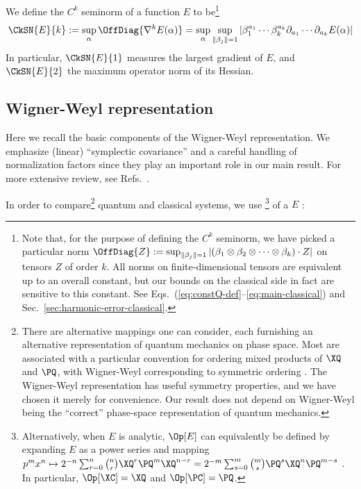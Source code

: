 \documentclass{article}
\numberwithin{equation}{section}
\begin{document}
We define the $C^k$ seminorm of a function $E$ to be\footnote{Note that, for the purpose of defining the $C^k$ seminorm, we have picked a particular norm $\OffDiag{Z} := \sup_{\|\beta_j\|=1}|(\beta_1\otimes\beta_2\otimes\cdots\otimes\beta_k)\cdot Z|$ on tensors $Z$ of order $k$. All norms on finite-dimensional tensors are equivalent up to an overall constant, but our bounds on the classical side in fact are sensitive to this constant. See Eqs.~(\ref{eq:constQ-def}--\ref{eq:main-classical}) and Sec.~\ref{sec:harmonic-error-classical}.}
\begin{align}
    \label{eq:c-k-seminorm-def}
    \CkSN{E}{k} := 
    \sup_\alpha \OffDiag{\nabla^k E(\alpha)}
    = \sup_\alpha \sup_{\|\beta_j\|=1}
    \left|\beta_1^{a_1} \cdots \beta_k^{a_k} \partial_{a_1}\cdots\partial_{a_k} E(\alpha)\right|
\end{align}
In particular, $\CkSN{E}{1}$ measures the largest gradient of $E$, and $\CkSN{E}{2}$ the maximum operator norm of its Hessian. 



 
	
\subsection{Wigner-Weyl representation}\label{sec:wigner-weyl}
Here we recall the basic components of the Wigner-Weyl representation. We emphasize (linear) ``symplectic covariance'' and a careful handling of normalization factors since they play an important role in our main result. For more extensive review, see Refs.~\cite{dimassi1999spectral, zworski2022semiclassical, degosson2021quantum,folland1989harmonic}.


In order to compare\footnote{There are alternative mappings one can consider, each furnishing an alternative representation of quantum mechanics on phase space.  Most are associated with a particular convention for ordering mixed products of $\XQ$ and $\PQ$, with Wigner-Weyl corresponding to symmetric ordering \cite{agarwal1970calculus,cohen2013weyl}. The Wigner-Weyl representation has useful symmetry properties, and we have chosen it merely for convenience.  Our result does not depend on Wigner-Weyl being the ``correct'' phase-space representation of quantum mechanics.} 
quantum and classical systems, we use \footnote{Alternatively, when $E$ is analytic, $\Op[E]$ can equivalently be defined by expanding $E$ as a power series and mapping $p^m x^n \mapsto 2^{-n}\sum_{r=0}^n  \binom{n}{r} \XQ^r \PQ^m \XQ^{n-r} = 2^{-m}\sum_{s=0}^m \binom{m}{s} \PQ^s \XQ^n \PQ^{m-s}$ \cite{mccoy1932function, curtright2014concise}. In particular, $\Op[\XC] = \XQ$ and $\Op[\PC] = \PQ$.}
of a  $E$ \cite{zworski2022semiclassical}:
\end{document}
